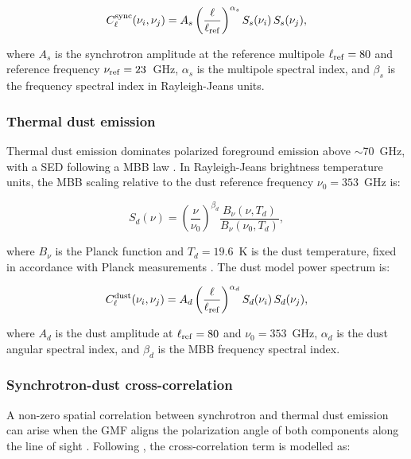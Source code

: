 \begin{equation}
    \label{eq:synch_model}
C_\ell^{\rm sync}(\nu_i, \nu_j) = A_s \left(\frac{\ell}{\ell_{\rm ref}}\right)^{\alpha_s}
S_s(\nu_i)\, S_s(\nu_j),
\end{equation}

where $A_s$ is the synchrotron amplitude at the reference multipole $\ell_{\rm ref} = 80$ and reference frequency $\nu_{\rm ref} = 23$~GHz, $\alpha_s$ is the multipole spectral index, and $\beta_s$ is the frequency spectral index in Rayleigh-Jeans units.

\subsubsection{Thermal dust emission}
\label{sec:dust}

Thermal dust emission dominates polarized foreground emission above $\sim$70~GHz, with a SED following a MBB law \citep{Planck_2018XI}. In Rayleigh-Jeans brightness temperature units, the MBB scaling relative to the dust reference frequency $\nu_0 = 353$~GHz is:

\begin{equation}
S_d(\nu) = \left(\frac{\nu}{\nu_0}\right)^{\beta_d} \frac{B_\nu(\nu, T_d)}{B_\nu(\nu_0, T_d)},
\end{equation}

where $B_\nu$ is the Planck function and $T_d = 19.6$~K is the dust temperature, fixed in accordance with Planck measurements \citep{Planck_2015X}. The dust model power spectrum is:

\begin{equation}
    \label{eq:dust_model}
C_\ell^{\rm dust}(\nu_i, \nu_j) = A_d \left(\frac{\ell}{\ell_{\rm ref}}\right)^{\alpha_d}
S_d(\nu_i)\, S_d(\nu_j),
\end{equation}

where $A_d$ is the dust amplitude at $\ell_{\rm ref} = 80$ and $\nu_0 = 353$~GHz, $\alpha_d$ is the dust angular spectral index, and $\beta_d$ is the MBB frequency spectral index.

\subsubsection{Synchrotron-dust cross-correlation}
\label{sec:corr}

A non-zero spatial correlation between synchrotron and thermal dust emission can arise when the GMF aligns the polarization angle of both components along the line of sight \citep{Choi_2015}. Following \citet{Hensley_2022}, the cross-correlation term is modelled as:

